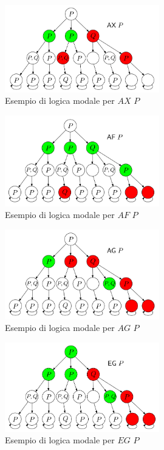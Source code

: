 \documentclass{article}
\begin{document}
\begin{figure}[!ht]
    \centering
    \includegraphics[width=0.6\textwidth]{axp.png}
    \caption{Esempio di logica modale per $AX\,\, P$}
    \label{fig:exp}
\end{figure}


\begin{figure}[!ht]
    \centering
    \includegraphics[width=0.6\textwidth]{afp.png}
    \caption{Esempio di logica modale per $AF\,\, P$}
    \label{fig:exp}
\end{figure}


\begin{figure}[!ht]
    \centering
    \includegraphics[width=0.6\textwidth]{agp.png}
    \caption{Esempio di logica modale per $AG\,\, P$}
    \label{fig:exp}
\end{figure}


\begin{figure}[!ht]
    \centering
    \includegraphics[width=0.6\textwidth]{egp.png}
    \caption{Esempio di logica modale per $EG\,\, P$}
    \label{fig:exp}
\end{figure}
\end{document}
